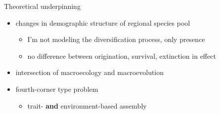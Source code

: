 \documentclass{beamer}
\begin{document}
\begin{frame}
  \begin{block}{Theoretical underpinning}
    \begin{itemize}
      \item changes in demographic structure of regional species pool
        \begin{itemize}
          \item I'm not modeling the diversification process, \alert{only presence}
          \item no difference between origination, survival, extinction in effect
        \end{itemize}
      \item intersection of macroecology and macroevolution
      \item fourth-corner type problem
        \begin{itemize}
          \item trait- \textbf{and} environment-based assembly
        \end{itemize}
    \end{itemize}
  \end{block}
\end{frame}
\end{document}
